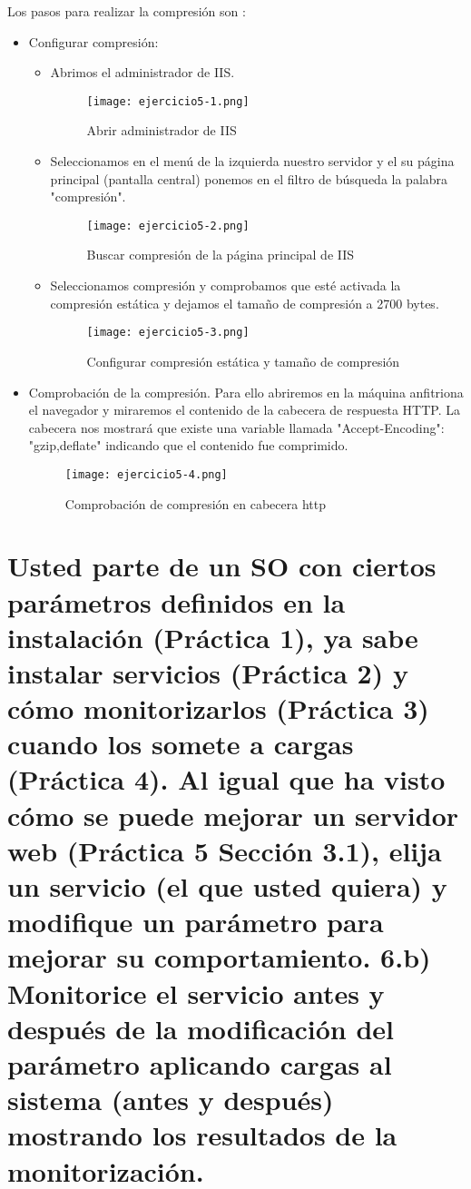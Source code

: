 	Los pasos para realizar la compresión son \cite{ejercicio5-4,ejercicio5-5,ejercicio5-6}:
	\begin{itemize}
		\item Configurar compresión:
			\begin{itemize}
				\item Abrimos el administrador de IIS.
					\begin{figure}[H] 
						\centering
						\texttt{[image: ejercicio5-1.png]} 
						\label{figura23} 
						\caption{Abrir administrador de IIS}
					\end{figure}
				\item Seleccionamos en el menú de la izquierda nuestro servidor y el su página principal (pantalla central) ponemos en el filtro de búsqueda la palabra "compresión".
					\begin{figure}[H] 
						\centering
						\texttt{[image: ejercicio5-2.png]} 
						\label{figura24} 
						\caption{Buscar compresión de la página principal de IIS}
					\end{figure}
				\item Seleccionamos compresión y comprobamos que esté activada la compresión estática y dejamos el tamaño de compresión a 2700 bytes.
					\begin{figure}[H] 
						\centering
						\texttt{[image: ejercicio5-3.png]} 
						\label{figura25} 
						\caption{Configurar compresión estática y tamaño de compresión}
					\end{figure}
			\end{itemize}
		\item Comprobación de la compresión. Para ello abriremos en la máquina anfitriona el navegador y miraremos el contenido de la cabecera de respuesta HTTP. La cabecera nos mostrará que existe una variable llamada "Accept-Encoding": "gzip,deflate" indicando que el contenido fue comprimido.
			\begin{figure}[H] 
				\centering
				\texttt{[image: ejercicio5-4.png]} 
				\label{figura26} 
				\caption{Comprobación de compresión en cabecera http}
			\end{figure}
	\end{itemize}
	
	\section{Usted parte de un SO con ciertos parámetros definidos en la instalación (Práctica 1), ya sabe instalar servicios (Práctica 2) y cómo monitorizarlos (Práctica 3) cuando los somete a cargas (Práctica 4). Al igual que ha visto cómo se puede mejorar un servidor web (Práctica 5 Sección 3.1), elija un servicio (el que usted quiera) y modifique un parámetro para mejorar su comportamiento. 6.b) Monitorice el servicio antes y después de la modificación del parámetro aplicando cargas al sistema (antes y después) mostrando los resultados de la monitorización.}
	
